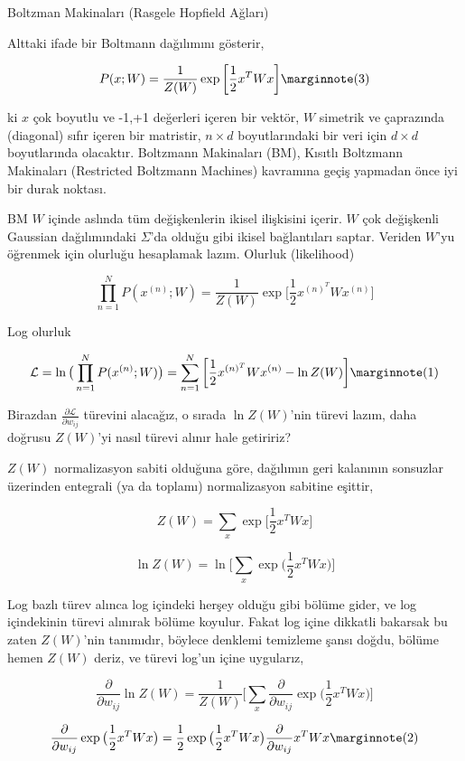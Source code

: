\documentclass[12pt,fleqn]{article}\usepackage{../../common}
\begin{document}
Boltzman Makinaları (Rasgele Hopfield Ağları) 

Alttaki ifade bir Boltmann dağılımını gösterir, 

$$  
P(x;W) = \frac{1}{Z(W)} 
\exp \bigg[ \frac{1}{2} x^T W x \bigg]
\mlabel{3}
$$

ki $x$ çok boyutlu ve -1,+1 değerleri içeren bir vektör, $W$ simetrik ve
çaprazında (diagonal) sıfır içeren bir matristir, $n \times d$ boyutlarındaki
bir veri için $d \times d$ boyutlarında olacaktır.  Boltzmann Makinaları (BM),
Kısıtlı Boltzmann Makinaları (Restricted Boltzmann Machines) kavramına geçiş
yapmadan önce iyi bir durak noktası.

BM $W$ içinde aslında tüm değişkenlerin ikisel ilişkisini içerir. $W$ çok
değişkenli Gaussian dağılımındaki $\Sigma$'da olduğu gibi ikisel bağlantıları
saptar. Veriden $W$'yu öğrenmek için olurluğu hesaplamak lazım. Olurluk
(likelihood)

$$  
\prod_{n=1}^{N} P(x^{(n)};W) = \frac{1}{Z(W)} 
\exp \bigg[ \frac{1}{2} x^{(n)^T} W x^{(n)} \bigg]
$$

Log olurluk

$$  
\mathcal{L} = \ln \big( \prod_{n=1}^{N} P(x^{(n)};W) \big) = 
\sum_{n=1}^{N} \bigg[ \frac{1}{2} x^{(n)^T} W x^{(n)} - \ln Z(W) \bigg]
\mlabel{1}
$$

Birazdan $\frac{\partial \mathcal L}{\partial w_{ij}}$ türevini alacağız, o
sırada $\ln Z(W)$'nin türevi lazım, daha doğrusu $Z(W)$'yi nasıl türevi alınır
hale getiririz?

$Z(W)$ normalizasyon sabiti olduğuna göre, dağılımın geri kalanının sonsuzlar
üzerinden entegrali (ya da toplamı) normalizasyon sabitine eşittir,

$$ 
Z(W) = \sum_x  \exp \bigg[ \frac{1}{2} x^T W x \bigg]
$$

$$ 
\ln Z(W) = \ln \bigg[ \sum_x  \exp \big( \frac{1}{2} x^T W x \big) \bigg]
$$

Log bazlı türev alınca log içindeki herşey olduğu gibi bölüme gider, ve log
içindekinin türevi alınırak bölüme koyulur. Fakat log içine dikkatli
bakarsak bu zaten $Z(W)$'nin tanımıdır, böylece denklemi temizleme şansı
doğdu, bölüme hemen $Z(W)$ deriz, ve türevi log'un içine uygularız,

$$ 
\frac{\partial}{\partial w_{ij}} \ln Z(W) = 
\frac{1}{Z(W)}
\bigg[ 
\sum_x \frac{\partial}{\partial w_{ij}} \exp \big( \frac{1}{2} x^T W x \big) 
\bigg]
$$

$$ 
\frac{\partial}{\partial w_{ij}} \exp \big( \frac{1}{2} x^T W x \big)  = 
\frac{1}{2}  \exp \big( \frac{1}{2} x^T W x \big) 
\frac{\partial}{\partial w_{ij}}x^T W x
\mlabel{2}
$$
\end{document}
